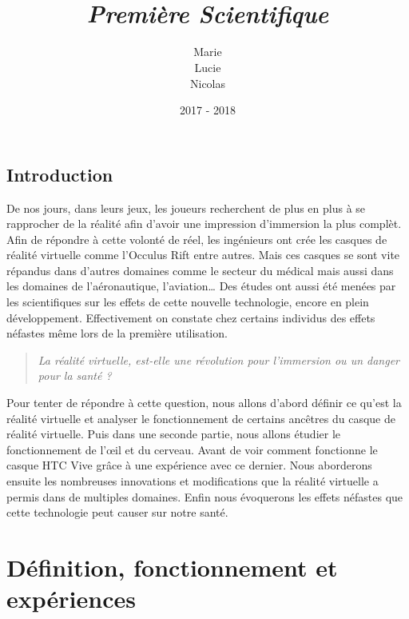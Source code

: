 \documentclass[12pt, a4paper]{report}
\title{
\sc{\bf{{\LARGE Travaux~$\cdot$~Personnels $\cdot$~Encadrés}}}\\
\vspace{1cm}
{\itshape{\Large Première Scientifique}} \\
\vspace{1cm}
\ovalbox{\parbox[c][2.5cm][c]{0.65\textwidth}{
\begin{center}
\sc{\bf{\Large - L'insolite -\\}}
\sc{\bf{\Large La réalité virtuelle}}
\end{center}}}}
\author{
Marie \sc{Bagrel}
\\
Lucie \sc{Chevallereau}
\\
Nicolas \sc{Gobillard}
\\
\sc{ps1}
}
\date{\sc{Année} 2017 - 2018}
\begin{document}
\pagestyle{fancy}
\vfill
\maketitle{}
\vfill

\newpage{}


\tableofcontents{}

\newpage{}

\chapter*{Introduction}

De nos jours, dans leurs jeux, les joueurs recherchent de plus en plus à se rapprocher de la réalité afin d'avoir une impression d'immersion la plus complèt. Afin de répondre à cette volonté de réel, les ingénieurs ont crée les casques de réalité virtuelle comme l'Occulus Rift entre autres.
Mais ces casques se sont vite répandus dans d'autres domaines comme le secteur du médical mais aussi dans les domaines de l'aéronautique, l'aviation\ldots{}
Des études ont aussi été menées par les scientifiques sur les effets de cette nouvelle technologie, encore en plein développement.
Effectivement on constate chez certains individus des effets néfastes même lors de la première utilisation.

\begin{quotation}\noindent\itshape
La réalité virtuelle, est-elle une révolution pour l'immersion ou un danger pour la santé ?
\end{quotation}


Pour tenter de répondre à cette question, nous allons d'abord définir ce qu'est la réalité virtuelle et analyser le fonctionnement de certains ancêtres du casque de réalité virtuelle. Puis dans une seconde partie, nous allons étudier le fonctionnement de l'\oe{}il et du cerveau. Avant de voir comment fonctionne le casque HTC Vive grâce à une expérience avec ce dernier. Nous aborderons ensuite les nombreuses innovations et modifications que la réalité virtuelle a permis dans de multiples domaines. Enfin nous évoquerons les effets néfastes que cette technologie peut causer sur notre santé.

\part{Définition, fonctionnement et expériences}
\end{document}

